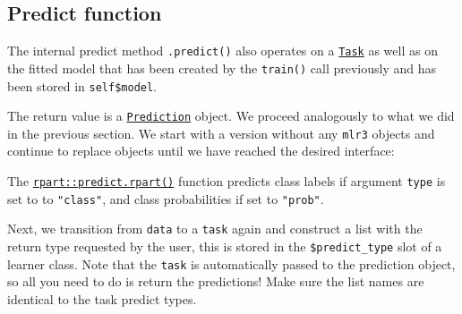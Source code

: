 \documentclass[
]{scrbook}
\newenvironment{Shaded}{\begin{snugshade}}{\end{snugshade}}
\newcommand{\AttributeTok}[1]{\textcolor[rgb]{0.77,0.63,0.00}{#1}}
\newcommand{\CommentTok}[1]{\textcolor[rgb]{0.56,0.35,0.01}{\textit{#1}}}
\newcommand{\FunctionTok}[1]{\textcolor[rgb]{0.00,0.00,0.00}{#1}}
\newcommand{\NormalTok}[1]{#1}
\newcommand{\OtherTok}[1]{\textcolor[rgb]{0.56,0.35,0.01}{#1}}
\newcommand{\SpecialCharTok}[1]{\textcolor[rgb]{0.00,0.00,0.00}{#1}}
\newcommand{\StringTok}[1]{\textcolor[rgb]{0.31,0.60,0.02}{#1}}
\renewenvironment{Shaded} {\begin{snugshade}\small} {\end{snugshade}}
\begin{document}
\hypertarget{learner-predict}{%
\subsection{Predict function}\label{learner-predict}}

The internal predict method \texttt{.predict()} also operates on a \href{https://mlr3.mlr-org.com/reference/Task.html}{\texttt{Task}} as well as on the fitted model that has been created by the \texttt{train()} call previously and has been stored in \texttt{self\$model}.

The return value is a \href{https://mlr3.mlr-org.com/reference/Prediction.html}{\texttt{Prediction}} object.
We proceed analogously to what we did in the previous section.
We start with a version without any \texttt{mlr3} objects and continue to replace objects until we have reached the desired interface:

\begin{Shaded}
\end{Shaded}

The \href{https://www.rdocumentation.org/packages/rpart/topics/predict.rpart}{\texttt{rpart::predict.rpart()}} function predicts class labels if argument \texttt{type} is set to to \texttt{"class"}, and class probabilities if set to \texttt{"prob"}.

Next, we transition from \texttt{data} to a \texttt{task} again and construct a list with the return type requested by the user, this is stored in the \texttt{\$predict\_type} slot of a learner class. Note that the \texttt{task} is automatically passed to the prediction object, so all you need to do is return the predictions! Make sure the list names are identical to the task predict types.
\end{document}
